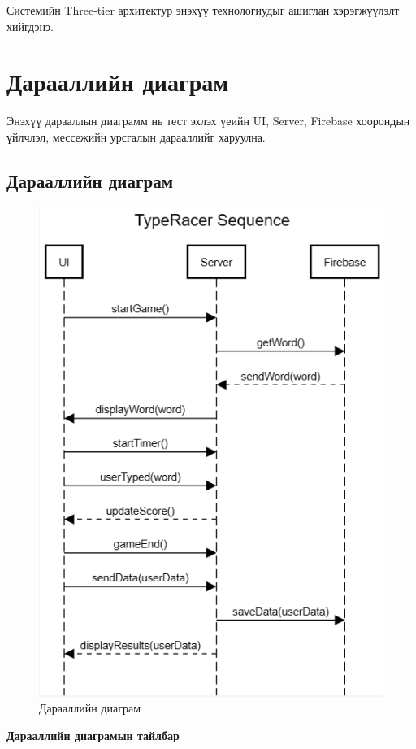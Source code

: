 Системийн Three-tier архитектур энэхүү технологиудыг ашиглан хэрэгжүүлэлт хийгдэнэ.

\pagebreak

\section{Дарааллийн диаграм}
Энэхүү дарааллын диаграмм нь тест эхлэх үеийн UI, Server, Firebase хоорондын үйлчлэл, мессежийн урсгалын дарааллийг харуулна.

\subsection{Дарааллийн диаграм}
\begin{figure}[h]
	\centering
	\includegraphics[width=12cm]{images/sequence_diagram.png}
	\caption{Дарааллийн диаграм}
	\label{fig:usecase}
\end{figure}
\pagebreak

\textbf{Дарааллийн диаграмын тайлбар}

